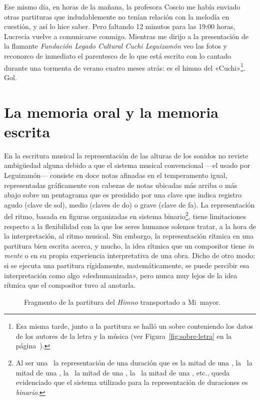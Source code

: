 \noindent Ese mismo día, en horas de la mañana, la profesora Coscio me había enviado otras partituras que indudablemente no tenían relación con la melodía en cuestión, y así lo hice saber. Pero faltando 12 minutos para las 19:00 horas, Lucrecia vuelve a comunicarse conmigo. Mientras me dirijo a la presentación de la flamante \emph{Fundación Legado Cultural Cuchi Leguizamón} veo las fotos y reconozco de inmediato el parentesco de lo que está escrito con lo cantado durante una tormenta de verano cuatro meses atrás: es el himno del «Cuchi»\footnote{Esa misma tarde, junto a la partitura se halló un sobre conteniendo los datos de los autores de la letra y la música (ver Figura~\ref{fig:sobre-letra} en la página~\pageref{fig:sobre-letra}).}. Gol.


\section{La memoria oral y la memoria escrita}
\label{sec:memoria-oral-escrita}

En la escritura musical la representación de las alturas de los sonidos no reviste ambigüedad alguna debido a que el sistema musical convencional ---el usado por Leguizamón--- consiste en doce notas afinadas en el temperamento igual, representadas gráficamente con cabezas de notas ubicadas más arriba o más abajo sobre un pentagrama que es presidido por una clave que indica registro agudo (clave de sol), medio (claves de do) o grave (clave de fa). La representación del ritmo, basada en figuras organizadas en sistema binario\footnote{Al ser una \blanca\ la representación de una duración que es la mitad de una \redonda, la \negra\ la mitad de una \blanca, la \corchea\ la mitad de una \negra, la \semicorchea\ la mitad de una \corchea, etc., queda evidenciado que el sistema utilizado para la representación de duraciones es \emph{binario}.}, tiene limitaciones respecto a la flexibilidad con la que los seres humanos solemos tratar, a la hora de la interpretación, al ritmo musical. Sin embargo, la representación rítmica en una partitura bien escrita acerca, y mucho, la idea rítmica que un compositor tiene \emph{in mente} o en su propia experiencia interpretativa de una obra. Dicho de otro modo: si se ejecuta una partitura rígidamente, matemáticamente, se puede percibir esa interpretación como algo «deshumanizada», pero nunca muy lejos de la idea rítmica que el compositor tuvo al anotarla.

\begin{figure}[htb]
\caption{Fragmento de la partitura del \emph{Himno} transportado a Mi\bemoltxt\ mayor.}
\label{fig:frag-partitura}
\end{figure}

